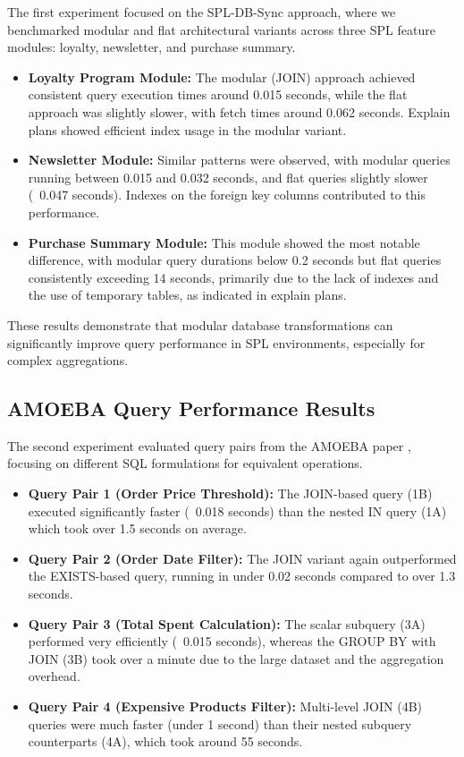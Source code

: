 The first experiment focused on the SPL-DB-Sync \cite{P6} approach, where we benchmarked modular and flat architectural variants across three SPL feature modules: loyalty, newsletter, and purchase summary.

\begin{itemize}
    \item \textbf{Loyalty Program Module:} The modular (JOIN) approach achieved consistent query execution times around 0.015 seconds, while the flat approach was slightly slower, with fetch times around 0.062 seconds. Explain plans showed efficient index usage in the modular variant.
    \item \textbf{Newsletter Module:} Similar patterns were observed, with modular queries running between 0.015 and 0.032 seconds, and flat queries slightly slower (~0.047 seconds). Indexes on the foreign key columns contributed to this performance.
    \item \textbf{Purchase Summary Module:} This module showed the most notable difference, with modular query durations below 0.2 seconds but flat queries consistently exceeding 14 seconds, primarily due to the lack of indexes and the use of temporary tables, as indicated in explain plans.
\end{itemize}

These results demonstrate that modular database transformations can significantly improve query performance in SPL environments, especially for complex aggregations.

\subsection{AMOEBA Query Performance Results}

The second experiment evaluated query pairs from the AMOEBA paper \cite{P3}, focusing on different SQL formulations for equivalent operations.

\begin{itemize}
    \item \textbf{Query Pair 1 (Order Price Threshold):} The JOIN-based query (1B) executed significantly faster (~0.018 seconds) than the nested IN query (1A) which took over 1.5 seconds on average.
    \item \textbf{Query Pair 2 (Order Date Filter):} The JOIN variant again outperformed the EXISTS-based query, running in under 0.02 seconds compared to over 1.3 seconds.
    \item \textbf{Query Pair 3 (Total Spent Calculation):} The scalar subquery (3A) performed very efficiently (~0.015 seconds), whereas the GROUP BY with JOIN (3B) took over a minute due to the large dataset and the aggregation overhead.
    \item \textbf{Query Pair 4 (Expensive Products Filter):} Multi-level JOIN (4B) queries were much faster (under 1 second) than their nested subquery counterparts (4A), which took around 55 seconds.
\end{itemize}

